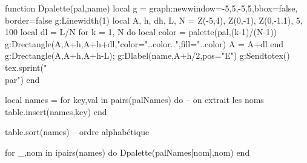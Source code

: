 \documentclass[10pt,a4paper,twocolumn]{article}%
\begin{document}
\begin{luacode*}
function Dpalette(pal,name)
    local g = graph:new{window={-5,5,-5,5},bbox=false, border=false}
    g:Linewidth(1)
    local A, h, dh, L, N = Z(-5,4), Z(0,-1), Z(0,-1.1), 5, 100
    local dl = L/N
    for k = 1, N do
        local color = palette(pal,(k-1)/(N-1))
        g:Drectangle(A,A+h,A+h+dl,"color="..color..",fill="..color)
        A = A+dl
    end
    g:Drectangle(A,A+h,A+h-L); g:Dlabel(name,A+h/2,{pos="E"})
    g:Sendtotex()
    tex.sprint("\\par")
end

local names = {}
for key,val in pairs(palNames) do -- on extrait les noms
    table.insert(names,key)
end

table.sort(names) -- ordre alphabétique

for _,nom in ipairs(names) do
    Dpalette(palNames[nom],nom)
end
\end{luacode*}
\end{document}
